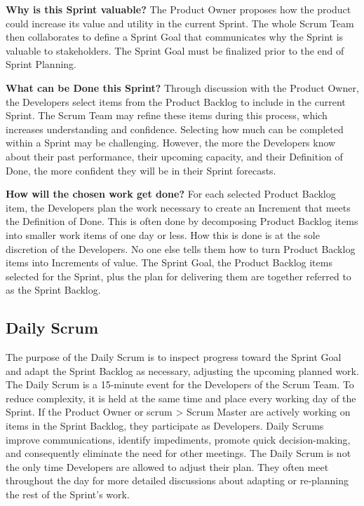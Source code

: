 \begin{flushleft}
	\textbf{Why is this Sprint valuable?} The Product Owner proposes how the product
	could increase its value and utility in the current Sprint. The whole Scrum Team
	then collaborates to define a Sprint Goal that communicates why the Sprint is
	valuable to stakeholders. The Sprint Goal must be finalized prior to the end of
	Sprint Planning.
\end{flushleft}

\begin{flushleft}
	\textbf{What can be Done this Sprint?} Through discussion with the Product Owner,
	the Developers select items from the Product Backlog to include in the current
	Sprint. The Scrum Team may refine these items during this process, which increases
	understanding and confidence. Selecting how much can be completed within a Sprint
	may be challenging. However, the more the Developers know about their past performance,
	their upcoming capacity, and their Definition of Done, the more confident they will
	be in their Sprint forecasts.
\end{flushleft}

\begin{flushleft}
	\textbf{How will the chosen work get done?} For each selected Product Backlog item,
	the Developers plan the work necessary to create an Increment that meets the Definition
	of Done. This is often done by decomposing Product Backlog items into smaller work
	items of one day or less. How this is done is at the sole discretion of the Developers.
	No one else tells them how to turn Product Backlog items into Increments of value.
	The Sprint Goal, the Product Backlog items selected for the Sprint, plus the plan
	for delivering them are together referred to as the Sprint Backlog.
\end{flushleft}

\subsection{Daily Scrum}\label{scrum-daily}

\begin{flushleft}
	The purpose of the Daily Scrum is to inspect progress toward the Sprint Goal and
	adapt the Sprint Backlog as necessary, adjusting the upcoming planned work. The
	Daily Scrum is a 15-minute event for the Developers of the Scrum Team. To reduce
	complexity, it is held at the same time and place every working day of the Sprint.
	If the Product Owner or scrum > Scrum Master are actively working on items in the
	Sprint Backlog, they participate as Developers. Daily Scrums improve communications,
	identify impediments, promote quick decision-making, and consequently eliminate the
	need for other meetings. The Daily Scrum is not the only time Developers are allowed
	to adjust their plan. They often meet throughout the day for more detailed discussions
	about adapting or re-planning the rest of the Sprint's work.
\end{flushleft}

